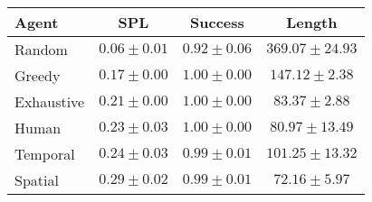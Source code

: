 \begin{tabular}{lccc}
    \toprule
    Agent & SPL & Success & Length \\
    \midrule
    Random & $0.06 \pm 0.01$ & $0.92 \pm 0.06$ & $369.07 \pm 24.93$\\
    Greedy & $0.17 \pm 0.00$ & $1.00 \pm 0.00$ & $147.12 \pm 2.38$\\
    Exhaustive & $0.21 \pm 0.00$ & $1.00 \pm 0.00$ & $83.37 \pm 2.88$\\
    Human & $0.23 \pm 0.03$ & $1.00 \pm 0.00$ & $80.97 \pm 13.49$\\
    Temporal & $0.24 \pm 0.03$ & $0.99 \pm 0.01$ & $101.25 \pm 13.32$\\
    Spatial & $0.29 \pm 0.02$ & $0.99 \pm 0.01$ & $72.16 \pm 5.97$\\
    \bottomrule
\end{tabular}

